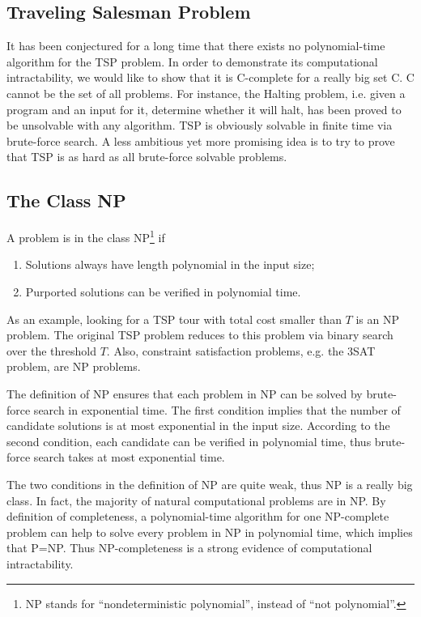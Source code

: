 \subsection{Traveling Salesman Problem}
\begin{description}
\end{description}
It has been conjectured for a long time that there exists no polynomial-time algorithm for the TSP problem. In order to demonstrate its computational intractability, we would like to show that it is C-complete for a really big set C. C cannot be the set of all problems. For instance, the Halting problem, i.e. given a program and an input for it, determine whether it will halt, has been proved to be unsolvable with any algorithm. TSP is obviously solvable in finite time via brute-force search. A less ambitious yet more promising idea is to try to prove that TSP is as hard as all brute-force solvable problems.
\subsection{The Class NP}
\begin{definition}
A problem is in the class NP\footnote{NP stands for ``nondeterministic polynomial'', instead of ``not polynomial''.} if
\begin{enumerate}
\item Solutions always have length polynomial in the input size;
\item Purported solutions can be verified in polynomial time. 
\end{enumerate} 
\end{definition}
As an example, looking for a TSP tour with total cost smaller than $T$ is an NP problem. The original TSP problem reduces to this problem via binary search over the threshold $T$. Also, constraint satisfaction problems, e.g. the 3SAT problem, are NP problems.  

The definition of NP ensures that each problem in NP can be solved by brute-force search in exponential time. The first condition implies that the number of candidate solutions is at most exponential in the input size. According to the second condition, each candidate can be verified in polynomial time, thus brute-force search takes at most exponential time. 

The two conditions in the definition of NP are quite weak, thus NP is a really big class. In fact, the majority of natural computational problems are in NP. By definition of completeness, a polynomial-time algorithm for one NP-complete problem can help to solve every problem in NP in polynomial time, which implies that P=NP. Thus NP-completeness is a strong evidence of computational intractability. 

